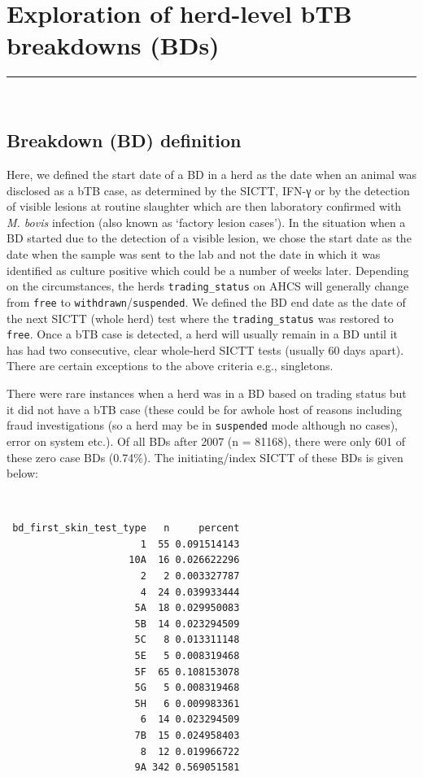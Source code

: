 \documentclass[
  letterpaper,
  DIV=11,
  numbers=noendperiod]{scrreprt}
\begin{document}
\chapter{Exploration of herd-level bTB breakdowns
(BDs)}\label{sec-breakdown}

\begin{center}\rule{0.5\linewidth}{0.5pt}\end{center}

\(~\) \(~\)

\section{Breakdown (BD) definition}\label{breakdown-bd-definition}

Here, we defined the start date of a BD in a herd as the date when an
animal was disclosed as a bTB case, as determined by the SICTT, IFN-γ or
by the detection of visible lesions at routine slaughter which are then
laboratory confirmed with \emph{M. bovis} infection (also known as
`factory lesion cases'). In the situation when a BD started due to the
detection of a visible lesion, we chose the start date as the date when
the sample was sent to the lab and not the date in which it was
identified as culture positive which could be a number of weeks later.
Depending on the circumstances, the herds \texttt{trading\_status} on
AHCS will generally change from \texttt{free} to
\texttt{withdrawn}/\texttt{suspended}. We defined the BD end date as the
date of the next SICTT (whole herd) test where the
\texttt{trading\_status} was restored to \texttt{free}. Once a bTB case
is detected, a herd will usually remain in a BD until it has had two
consecutive, clear whole-herd SICTT tests (usually 60 days apart). There
are certain exceptions to the above criteria e.g., singletons.

There were rare instances when a herd was in a BD based on trading
status but it did not have a bTB case (these could be for awhole host of
reasons including fraud investigations (so a herd may be in
\texttt{suspended} mode although no cases), error on system etc.). Of
all BDs after 2007 (n = 81168), there were only 601 of these zero case
BDs (0.74\%). The initiating/index SICTT of these BDs is given below:

\(~\) \(~\)

\begin{verbatim}
 bd_first_skin_test_type   n     percent
                       1  55 0.091514143
                     10A  16 0.026622296
                       2   2 0.003327787
                       4  24 0.039933444
                      5A  18 0.029950083
                      5B  14 0.023294509
                      5C   8 0.013311148
                      5E   5 0.008319468
                      5F  65 0.108153078
                      5G   5 0.008319468
                      5H   6 0.009983361
                       6  14 0.023294509
                      7B  15 0.024958403
                       8  12 0.019966722
                      9A 342 0.569051581
\end{verbatim}
\end{document}
